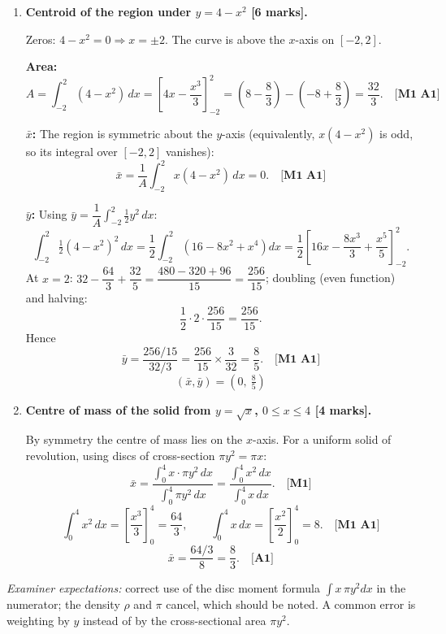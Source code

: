 \documentclass[11pt]{article}
\begin{document}
\begin{corrige}
\begin{enumerate}
\item \textbf{Centroid of the region under $y = 4 - x^2$ [6 marks].}

Zeros: $4 - x^2 = 0 \Rightarrow x = \pm 2$. The curve is above the $x$-axis on $[-2,2]$.

\textbf{Area:}
\[
A = \int_{-2}^{2}(4 - x^2)\,dx = \left[4x - \frac{x^3}{3}\right]_{-2}^{2} = \left(8 - \frac{8}{3}\right) - \left(-8 + \frac{8}{3}\right) = \frac{32}{3}. \quad \textbf{[M1 A1]}
\]

\textbf{$\bar{x}$:} The region is symmetric about the $y$-axis (equivalently, $x(4-x^2)$ is odd, so its integral over $[-2,2]$ vanishes):
\[
\bar{x} = \frac{1}{A}\int_{-2}^{2} x(4 - x^2)\,dx = 0. \quad \textbf{[M1 A1]}
\]

\textbf{$\bar{y}$:} Using $\bar{y} = \dfrac{1}{A}\displaystyle\int_{-2}^{2}\tfrac{1}{2}y^2\,dx$:
\[
\int_{-2}^{2}\tfrac{1}{2}(4 - x^2)^2\,dx = \frac{1}{2}\int_{-2}^{2}\left(16 - 8x^2 + x^4\right)dx = \frac{1}{2}\left[16x - \frac{8x^3}{3} + \frac{x^5}{5}\right]_{-2}^{2}.
\]
At $x = 2$: $32 - \dfrac{64}{3} + \dfrac{32}{5} = \dfrac{480 - 320 + 96}{15} = \dfrac{256}{15}$; doubling (even function) and halving:
\[
\frac{1}{2}\cdot 2\cdot\frac{256}{15} = \frac{256}{15}.
\]
Hence
\[
\bar{y} = \frac{256/15}{32/3} = \frac{256}{15}\times\frac{3}{32} = \frac{8}{5}. \quad \textbf{[M1 A1]}
\]
\[
\boxed{(\bar{x}, \bar{y}) = \left(0,\ \tfrac{8}{5}\right)}
\]

\item \textbf{Centre of mass of the solid from $y = \sqrt{x}$, $0 \le x \le 4$ [4 marks].}

By symmetry the centre of mass lies on the $x$-axis. For a uniform solid of revolution, using discs of cross-section $\pi y^2 = \pi x$:
\[
\bar{x} = \frac{\displaystyle\int_0^4 x\cdot \pi y^2\,dx}{\displaystyle\int_0^4 \pi y^2\,dx} = \frac{\displaystyle\int_0^4 x^2\,dx}{\displaystyle\int_0^4 x\,dx}. \quad \textbf{[M1]}
\]
\[
\int_0^4 x^2\,dx = \left[\frac{x^3}{3}\right]_0^4 = \frac{64}{3}, \qquad \int_0^4 x\,dx = \left[\frac{x^2}{2}\right]_0^4 = 8. \quad \textbf{[M1 A1]}
\]
\[
\bar{x} = \frac{64/3}{8} = \boxed{\frac{8}{3}}. \quad \textbf{[A1]}
\]
\end{enumerate}
\textit{Examiner expectations:} correct use of the disc moment formula $\int x\,\pi y^2 dx$ in the numerator; the density $\rho$ and $\pi$ cancel, which should be noted. A common error is weighting by $y$ instead of by the cross-sectional area $\pi y^2$.
\end{corrige}
\end{document}
